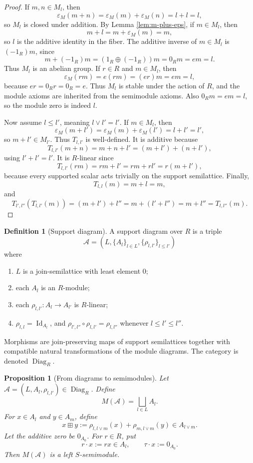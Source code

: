 \documentclass[11pt]{article}
\newcommand{\Id}{\operatorname{Id}}
\newcommand{\eps}{\varepsilon}
\theoremstyle{plain}
\newtheorem{proposition}[theorem]{Proposition}
\theoremstyle{definition}
\newtheorem{definition}[theorem]{Definition}
\begin{document}
\begin{proof}
If \(m,n\in M_l\), then
\[
   \eps_M(m+n)=\eps_M(m)+\eps_M(n)=l+l=l,
\]
so \(M_l\) is closed under addition.  By Lemma \ref{lem:m-plus-eps}, if \(m\in M_l\), then
\[
   m+l=m+\eps_M(m)=m,
\]
so \(l\) is the additive identity in the fiber.  The additive inverse of \(m\in M_l\) is \((-1_R)m\), since
\[
   m+(-1_R)m=(1_R\oplus(-1_R))m=0_Rm=em=l.
\]
Thus \(M_l\) is an abelian group.  If \(r\in R\) and \(m\in M_l\), then
\[
   \eps_M(rm)=e(rm)=(er)m=em=l,
\]
because \(er=0_Rr=0_R=e\).  Thus \(M_l\) is stable under the action of \(R\), and the module axioms are inherited from the semimodule axioms.  Also \(0_Rm=em=l\), so the module zero is indeed \(l\).

Now assume \(l\le l'\), meaning \(l\vee l'=l'\).  If \(m\in M_l\), then
\[
   \eps_M(m+l')=\eps_M(m)+\eps_M(l')=l+l'=l',
\]
so \(m+l'\in M_{l'}\).  Thus \(T_{l,l'}\) is well-defined.  It is additive because
\[
   T_{l,l'}(m+n)=m+n+l'=(m+l')+(n+l'),
\]
using \(l'+l'=l'\).  It is \(R\)-linear since
\[
   T_{l,l'}(rm)=rm+l'=rm+rl'=r(m+l'),
\]
because every supported scalar acts trivially on the support semilattice.  Finally,
\[
   T_{l,l}(m)=m+l=m,
\]
and
\[
   T_{l',l''}(T_{l,l'}(m))=(m+l')+l''=m+(l'+l'')=m+l''=T_{l,l''}(m).
\]
\end{proof}

\begin{definition}[Support diagram]\label{def:support-diagram}
A support diagram over \(R\) is a triple
\[
   \mathcal A=(L,\{A_l\}_{l\in L},\{\rho_{l,l'}\}_{l\le l'})
\]
where
\begin{enumerate}[label=\textup{(\arabic*)}]
\item \(L\) is a join-semilattice with least element \(0\);
\item each \(A_l\) is an \(R\)-module;
\item each \(\rho_{l,l'}:A_l\to A_{l'}\) is \(R\)-linear;
\item \(\rho_{l,l}=\Id_{A_l}\), and \(\rho_{l',l''}\circ\rho_{l,l'}=\rho_{l,l''}\) whenever \(l\le l'\le l''\).
\end{enumerate}
Morphisms are join-preserving maps of support semilattices together with compatible natural transformations of the module diagrams.  The category is denoted \(\operatorname{Diag}_R\).
\end{definition}

\begin{proposition}[From diagrams to semimodules]\label{prop:diag-to-semi}
Let \(\mathcal A=(L,A_l,\rho_{l,l'})\in\operatorname{Diag}_R\).  Define
\[
   M(\mathcal A)=\bigsqcup_{l\in L}A_l.
\]
For \(x\in A_l\) and \(y\in A_m\), define
\[
   x\boxplus y:=\rho_{l,l\vee m}(x)+\rho_{m,l\vee m}(y)\in A_{l\vee m}.
\]
Let the additive zero be \(0_{A_0}\).  For \(r\in R\), put
\[
   r\cdot x:=rx\in A_l,
   \qquad
   \tau\cdot x:=0_{A_0}.
\]
Then \(M(\mathcal A)\) is a left \(S\)-semimodule.
\end{proposition}
\end{document}
